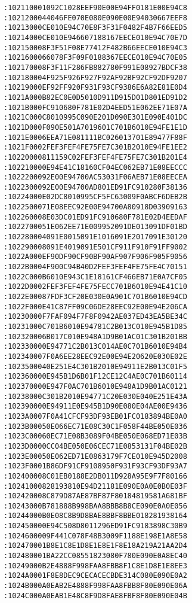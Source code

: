 \begin{lstlisting}[language={}, basicstyle=\scriptsize, caption=Машинний код]
:102110001092C1028EEF90E00E94FF0181E00E94C8
:1021200044046FE070E080E090E00E94030667EEF8
:10213000CE010E94C70E8F3F31F0482F4B7F66EED5
:10214000CE010E946607188167EECE010E94C70E7D
:102150008F3F51F08E77412F482B66EECE010E94C3
:1021600066078F3F09F0188367EECE010E94C70E05
:102170008F3F11F286FB882780F991E08927BDCF38
:102180004F925F926F927F92AF92BF92CF92DF9207
:10219000EF92FF920F931F93CF9386E6A82E81E0D4
:1021A000B82EC0E0D5010D911D915D01D801ED91D2
:1021B000FC910680F781E02D4EED51E062EE71E07A
:1021C000C8010995C090E201D090E301E090E401DC
:1021D000F090E501A7019601C701B6010E94FE1E1D
:1021E0006EEA71E081111BC026013701E89477F88F
:1021F0002FEF3FEF4FE75FE7C301B2010E94FE1EE2
:10220000811159C02FEF3FEF4FE75FE7C301B201E4
:102210000E94E41C18160CF04EC062EB71E08EECCC
:1022200092E00E94700AC53031F06AEB71E08EECEA
:1022300092E00E94700AD801ED91FC910280F38136
:10224000E02DC8010995CF5FC63009F0ABCF6DEB2B
:1022500071E08EEC92E00E94700A80918D03909163
:102260008E03DC01ED91FC910680F781E02D4EEDAF
:1022700051E062EE71E009952091DE013091DF01BD
:102280004091E0015091E1016091E2017091E30120
:102290008091E4019091E501CF911F910F91FF9002
:1022A000EF90DF90CF90BF90AF907F906F905F9056
:1022B0004F900C94B40D2FEF3FEF4FE75FE4C70151
:1022C000B6010E943C1E18161CF466EB71E0A7CF05
:1022D0002FEF3FEF4FE75FECC701B6010E94E41C10
:1022E00087FDF3CF20E030E0A901C701B6010E94CD
:1022F000E41C87FF09C06DE28EEC92E00E94E206CA
:10230000F7FAF094F7F8F0942AE037ED43EA5BE34C
:10231000C701B6010E94781C2B013C010E945B1D85
:102320006B017C010E948A1D9B01AC01C301B201BB
:102330000E94771C2B013C014AE0C701B6010E94B4
:102340007F0A6EE28EEC92E00E94E20620E030E02E
:1023500040E251E4C301B2010E94911E2B013C01F5
:102360000E945B1D6B01F12CE12C4AE0C701B60114
:102370000E947F0AC701B6010E948A1D9B01AC0121
:10238000C301B2010E94771C20E030E040E251E43A
:102390000E94911E0E945B1D90E080E04AE00E9436
:1023A0007F0A41CFCF93DF93EB01FC0183894BE0A0
:1023B00050E066EC71E08C30C1F058F44BE050E036
:1023C00060EC71E08B3089F04BE050E068ED71E03B
:1023D0000CC04BE050E06CEC71E0853131F04BE02B
:1023E00050E062ED71E0863179F7CE010E945D2008
:1023F0001B86DF91CF9108950F931F93CF93DF93A7
:102400008C01EB0188E2DB011D928A95E9F7F80166
:10241000828193810E94D21181E090E0A0E0B0E03F
:102420008C879D87AE87BF87F80184819581A681BF
:10243000B781888B998BAA8BBB8B8CE090E0A0E056
:10244000B0E08C8B9D8BAE8BBF8BBE018281938164
:102450000E94C508D8011296ED91FC9183898C30B9
:1024600009F441C078F48B3009F1188E198E1A8E58
:102470001B8E1C8E1D8E1E8E1F8E18A219A21AA2D4
:102480001BA22CC08551823080F780E090E0A8EC40
:10249000B2E4888F998FAA8FBB8F1C8E1D8E1E8EE3
:1024A0001F8E8DEC9CECACECBDE314C080E090E0A2
:1024B000A0EAB2E4888F998FAA8FBB8F80E090E06A
:1024C000A0EAB1E48C8F9D8FAE8FBF8F80E090E04B

\end{lstlisting}
